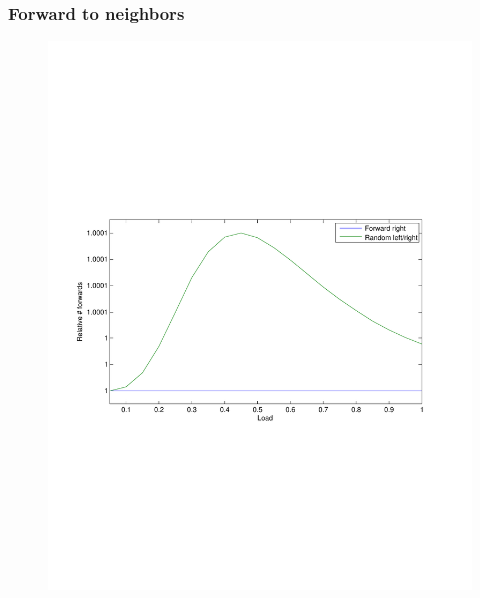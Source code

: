\documentclass[compress]{beamer}
\begin{document}
\begin{frame}
\frametitle{Forward to neighbors}
\begin{figure}[h!tb]
\includegraphics[width=\textwidth,clip=true,trim=4em 22em 6em 23em]{../resources/validate_rlr.pdf}
\end{figure}
\end{frame}
\end{document}
